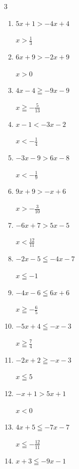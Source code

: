 \begin{multicols}{3}
\begin{enumerate}
        $\displaystyle x<\frac{5}{11}$

  \item $5x+1>-4x+4$

        $\displaystyle x>\frac{1}{3}$

  \item $6x+9>-2x+9$

        $\displaystyle x>0$

  \item $4x-4\geqq -9x-9$

        $\displaystyle x\geqq -\frac{5}{13}$

  \item $x-1<-3x-2$

        $\displaystyle x<-\frac{1}{4}$

  \item $-3x-9>6x-8$

        $\displaystyle x<-\frac{1}{9}$

\columnbreak %

\resetques

  \item $9x+9>-x+6$

        $\displaystyle x>-\frac{3}{10}$

  \item $-6x+7>5x-5$

        $\displaystyle x<\frac{12}{11}$

  \item $-2x-5\leqq -4x-7$

        $\displaystyle x\leqq -1$

  \item $-4x-6\leqq 6x+6$

        $\displaystyle x\geqq -\frac{6}{5}$

  \item $-5x+4\leqq -x-3$

        $\displaystyle x\geqq \frac{7}{4}$

  \item $-2x+2\geqq -x-3$

        $\displaystyle x\leqq 5$

  \item $-x+1>5x+1$

        $\displaystyle x<0$

  \item $4x+5\leqq -7x-7$

        $\displaystyle x\leqq -\frac{12}{11}$

  \item $x+3\leqq -9x-1$


\end{enumerate}
\end{multicols}
